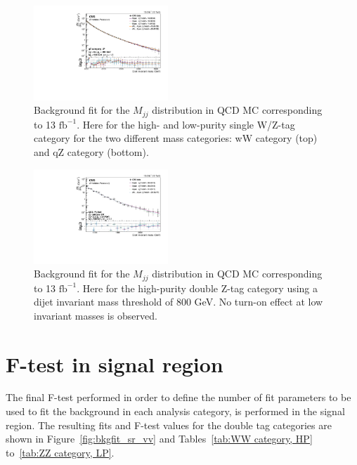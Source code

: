\begin{figure}[h!]
\includegraphics[width=0.45\textwidth]{figures/analysis/search2/AN-16-235/plots/qZLP_fitComp.pdf}
\caption{Background fit for the $M_{jj}$ distribution in QCD MC corresponding to 13 $\textrm{fb}^{-1}$. Here for the high- and low-purity single W/Z-tag category for the two different mass categories: wW category (top) and qZ category (bottom).}
\label{fig:bkgfitQCD_qV}
\end{figure}

\begin{figure}[h!]
\centering
\includegraphics[width=0.45\textwidth]{figures/analysis/search2/AN-16-235/plots/ZZHP_fitComp_mjj800.pdf}
\caption{Background fit for the $M_{jj}$ distribution in QCD MC corresponding to 13 $\textrm{fb}^{-1}$. Here for the high-purity double Z-tag category using a dijet invariant mass threshold of 800 GeV. No turn-on effect at low invariant masses is observed.}
\label{fig:bkgfitQCD_ZZHP}
\end{figure}


% 

\section{F-test in signal region}
\label{sec:app:2016:ftest}

The final F-test performed in order to define the number of fit parameters to be used to fit the background in each analysis category, is performed in the signal region. The resulting fits and F-test values for the double tag categories are shown in
Figure~\ref{fig:bkgfit_sr_vv} and Tables~\ref{tab:WW category, HP} to~\ref{tab:ZZ category, LP}.

